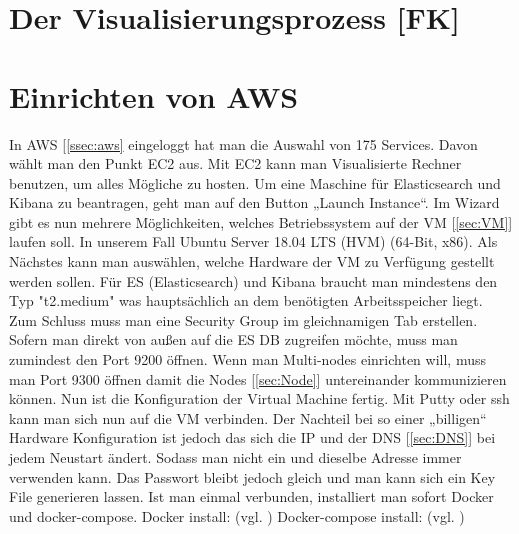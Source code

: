 \section{Der Visualisierungsprozess [FK]}
\section{Einrichten von AWS}
In AWS [\ref{ssec:aws} eingeloggt hat man die Auswahl von 175 Services. Davon wählt man den Punkt EC2 aus. Mit EC2 kann man Visualisierte Rechner benutzen, um alles Mögliche zu hosten. Um eine Maschine für Elasticsearch und Kibana zu beantragen, geht man auf den Button „Launch Instance“. Im Wizard gibt es nun mehrere Möglichkeiten, welches Betriebssystem auf der VM [\ref{sec:VM}] laufen soll. In unserem Fall Ubuntu Server 18.04 LTS (HVM) (64-Bit, x86). Als Nächstes kann man auswählen, welche Hardware der VM zu Verfügung gestellt werden sollen. Für ES (Elasticsearch) und Kibana braucht man mindestens den Typ "t2.medium" was hauptsächlich an dem benötigten Arbeitsspeicher liegt. Zum Schluss muss man eine Security Group im gleichnamigen Tab erstellen. Sofern man direkt von außen auf die ES DB zugreifen möchte, muss man zumindest den Port 9200 öffnen. Wenn man Multi-nodes einrichten will, muss man Port 9300 öffnen damit die Nodes [\ref{sec:Node}] untereinander kommunizieren können. 
Nun ist die Konfiguration der Virtual Machine fertig. Mit Putty oder ssh kann man sich nun auf die VM verbinden. Der Nachteil bei so einer „billigen“ Hardware Konfiguration ist jedoch das sich die IP und der DNS [\ref{sec:DNS}] bei jedem Neustart ändert. Sodass man nicht ein und dieselbe Adresse immer verwenden kann. Das Passwort bleibt jedoch gleich und man kann sich ein Key File generieren lassen.
Ist man einmal verbunden, installiert man sofort Docker und docker-compose.
Docker install: (vgl. \cite{DockerInstall})
Docker-compose install: (vgl. \cite{DockerComposeInstall})
